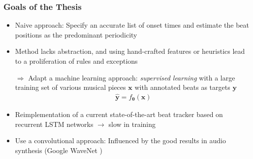 \documentclass{beamer}
\begin{document}



\begin{frame}
\frametitle{Goals of the Thesis}
\begin{itemize}
\item Naive approach: Specify an accurate list of onset times and estimate the beat positions as the predominant periodicity 
\item Method lacks abstraction, and using hand-crafted features or heuristics lead to a proliferation of rules and exceptions
\item[$\Rightarrow$] Adapt a machine learning approach: \emph{supervised learning} with a large training set of various musical pieces $\mathbf x$ with annotated beats as targets $\mathbf y$
\begin{align}
\hat{\mathbf y} = f_{\boldsymbol \theta}(\mathbf x)
\end{align} 
\item Reimplementation of a current state-of-the-art beat tracker \cite{Boeck2014} based on recurrent LSTM networks $\rightarrow$ slow in training 
\item Use a convolutional approach: Influenced by the good results in audio synthesis (Google WaveNet \cite{Oord2016})

\end{itemize}


\end{frame}
\end{document}
